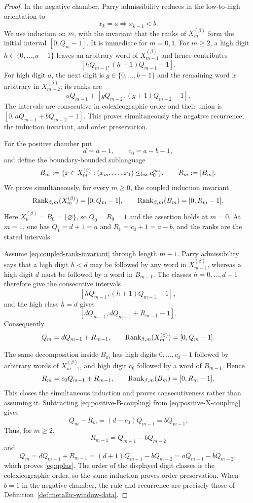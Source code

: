 \begin{proof}
In the negative chamber, Parry admissibility reduces in the low-to-high
orientation to
\[
x_k=a\Longrightarrow x_{k-1}<b.
\]
We use induction on $m$, with the invariant that the ranks of $X_m^{(\beta)}$
form the initial interval $[0,Q_m-1]$.  It is immediate for $m=0,1$.  For
$m\ge2$, a high digit $h\in\{0,\ldots,a-1\}$ leaves an arbitrary word of
$X_{m-1}^{(\beta)}$ and hence contributes
\[
[hQ_{m-1},(h+1)Q_{m-1}-1].
\]
For high digit $a$, the next digit is
$g\in\{0,\ldots,b-1\}$ and the remaining word is arbitrary in
$X_{m-2}^{(\beta)}$; its ranks are
\[
aQ_{m-1}+[gQ_{m-2},(g+1)Q_{m-2}-1].
\]
The intervals are consecutive in colexicographic order and their union is
$[0,aQ_{m-1}+bQ_{m-2}-1]$.  This proves simultaneously the negative
recurrence, the induction invariant, and order preservation.

For the positive chamber put
\[
d=a-1,\qquad c_0=a-b-1,
\]
and define the boundary-bounded sublanguage
\[
B_m:=\{x\in X_m^{(\beta)}:
(x_m,\ldots,x_1)\le_{\rm lex}c_0^m\},
\qquad R_m:=|B_m|.
\]
We prove simultaneously, for every $m\ge0$, the coupled induction invariant
\begin{equation}
\operatorname{Rank}_{\beta,m}(X_m^{(\beta)})=[0,Q_m-1],
\qquad
\operatorname{Rank}_{\beta,m}(B_m)=[0,R_m-1].
\label{eq:coupled-rank-invariant}
\end{equation}
Here $X_0^{(\beta)}=B_0=\{\varnothing\}$, so $Q_0=R_0=1$ and the assertion
holds at $m=0$.  At $m=1$, one has $Q_1=d+1=a$ and
$R_1=c_0+1=a-b$, and the ranks are the stated intervals.

Assume \eqref{eq:coupled-rank-invariant} through length $m-1$.  Parry
admissibility says that a high digit $h<d$ may be followed by any word in
$X_{m-1}^{(\beta)}$, whereas a high digit $d$ must be followed by a word in
$B_{m-1}$.  The classes $h=0,\ldots,d-1$ therefore give the consecutive
intervals
\[
[hQ_{m-1},(h+1)Q_{m-1}-1],
\]
and the high class $h=d$ gives
\[
[dQ_{m-1},dQ_{m-1}+R_{m-1}-1].
\]
Consequently
\begin{equation}
Q_m=dQ_{m-1}+R_{m-1},
\qquad
\operatorname{Rank}_{\beta,m}(X_m^{(\beta)})=[0,Q_m-1].
\label{eq:positive-X-coupling}
\end{equation}

The same decomposition inside $B_m$ has high digits
$0,\ldots,c_0-1$ followed by arbitrary words of $X_{m-1}^{(\beta)}$, and
high digit $c_0$ followed by a word of $B_{m-1}$.  Hence
\begin{equation}
R_m=c_0Q_{m-1}+R_{m-1},
\qquad
\operatorname{Rank}_{\beta,m}(B_m)=[0,R_m-1].
\label{eq:positive-B-coupling}
\end{equation}
This closes the simultaneous induction and proves consecutiveness rather than
assuming it.  Subtracting \eqref{eq:positive-B-coupling} from
\eqref{eq:positive-X-coupling} gives
\[
Q_m-R_m=(d-c_0)Q_{m-1}=bQ_{m-1}.
\]
Thus, for $m\ge2$,
\[
R_{m-1}=Q_{m-1}-bQ_{m-2}
\]
and
\[
Q_m=dQ_{m-1}+R_{m-1}
=(d+1)Q_{m-1}-bQ_{m-2}
=aQ_{m-1}-bQ_{m-2},
\]
which proves \eqref{eq:qplus}.  The order of the displayed digit classes is
the colexicographic order, so the same induction proves order preservation.
When $b=1$ in the negative chamber, the rule and recurrence are precisely
those of Definition~\ref{def:metallic-window-data}.
\end{proof}

